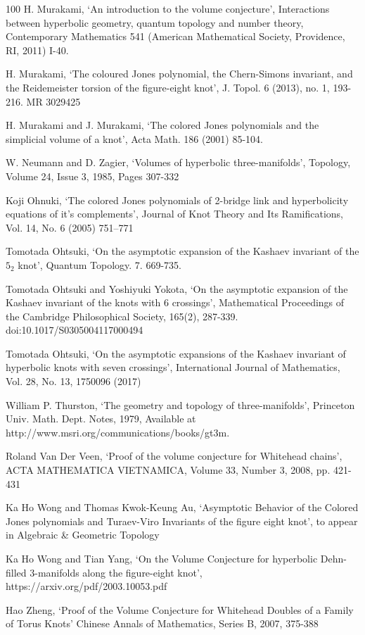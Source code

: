 \documentclass[10pt,a4paper]{article}
\begin{document}
\begin{thebibliography}{100}
  H. Murakami,
  `An introduction to the volume conjecture',
  Interactions between hyperbolic geometry, quantum topology and number theory, Contemporary Mathematics 541 (American Mathematical Society,
Providence, RI, 2011) I-40.

  H. Murakami,
  `The coloured Jones polynomial, the Chern-Simons invariant, and the Reidemeister torsion of the figure-eight knot', J. Topol. 6 (2013), no. 1, 193-216. MR 3029425

  H. Murakami and J. Murakami,
  `The colored Jones polynomials and the simplicial volume of a knot',
  Acta Math. 186 (2001) 85-104.
  
  W. Neumann and D. Zagier,
  `Volumes of hyperbolic three-manifolds',
  Topology, Volume 24, Issue 3, 1985, Pages 307-332
  
  Koji Ohnuki,
  `The colored Jones polynomials of 2-bridge link and hyperbolicity equations of it's complements',
  Journal of Knot Theory and Its Ramifications, Vol. 14, No. 6 (2005) 751–771
  
 Tomotada Ohtsuki,
 `On the asymptotic expansion of the Kashaev invariant of the $5_2$ knot',   Quantum Topology. 7. 669-735. 
  
 Tomotada Ohtsuki and Yoshiyuki Yokota,
 `On the asymptotic expansion of the Kashaev invariant of the knots with 6
crossings', Mathematical Proceedings of the Cambridge Philosophical Society, 165(2), 287-339. doi:10.1017/S0305004117000494

 Tomotada Ohtsuki,
  `On the asymptotic expansions of the Kashaev invariant of hyperbolic knots with seven crossings',
  International Journal of Mathematics, Vol. 28, No. 13, 1750096 (2017)

 William P. Thurston,
 `The geometry and topology of three-manifolds',
  Princeton Univ. Math. Dept. Notes, 1979, Available at http://www.msri.org/communications/books/gt3m.

  Roland Van Der Veen,
  `Proof of the volume conjecture for Whitehead chains',
  ACTA MATHEMATICA VIETNAMICA, Volume 33, Number 3, 2008, pp. 421-431

  Ka Ho Wong and Thomas Kwok-Keung Au,
  `Asymptotic Behavior of the Colored Jones polynomials and Turaev-Viro Invariants of the figure eight knot', to appear in Algebraic \& Geometric Topology

  Ka Ho Wong and Tian Yang,
  `On the Volume Conjecture for hyperbolic Dehn-filled 3-manifolds along the figure-eight knot', https://arxiv.org/pdf/2003.10053.pdf

  Hao Zheng,
  `Proof of the Volume Conjecture for Whitehead Doubles of a Family of Torus Knots'
  Chinese Annals of Mathematics, Series B, 2007, 375-388

\end{thebibliography}
\end{document}
